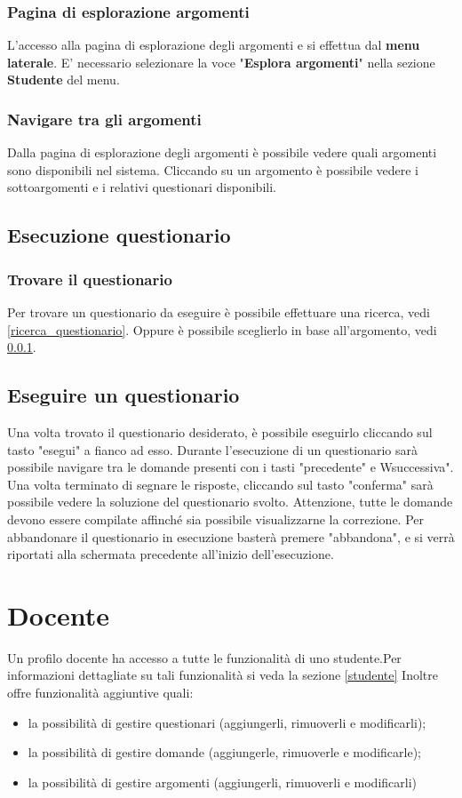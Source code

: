\documentclass[12pt,a4paper]{article}
\begin{document}
	\subsubsection{Pagina di esplorazione argomenti} \label{esplorazione_arg}
	L'accesso alla pagina di esplorazione degli argomenti e si effettua dal \textbf{menu laterale}. 
	E' necessario selezionare la voce "\textbf{Esplora argomenti}" nella sezione \textbf{Studente} del menu.
	\subsubsection{Navigare tra gli argomenti}
	Dalla pagina di esplorazione degli argomenti è possibile vedere quali argomenti sono disponibili nel sistema. Cliccando su un argomento è possibile vedere i sottoargomenti e i relativi questionari disponibili.
	
	\subsection{Esecuzione questionario}
	\subsubsection{Trovare il questionario}
	Per trovare un questionario da eseguire è possibile effettuare una ricerca, vedi \ref{ricerca_questionario}.
	Oppure è possibile sceglierlo in base all'argomento, vedi \ref{esplorazione_arg}.
	\subsection{Eseguire un questionario}
	Una  volta trovato il questionario desiderato, è possibile eseguirlo cliccando sul tasto "esegui" a fianco ad esso.
	Durante l'esecuzione di un questionario sarà possibile navigare tra le domande presenti con i tasti "precedente" e Wsuccessiva".
	Una volta terminato di segnare le risposte, cliccando sul tasto "conferma" sarà possibile vedere la soluzione del questionario svolto.
	Attenzione, tutte le domande devono essere compilate affinché sia possibile visualizzarne la correzione.
	Per abbandonare il questionario in esecuzione basterà premere "abbandona", e si verrà riportati alla schermata precedente all'inizio dell'esecuzione.
	
	\section{Docente}\label{docente}
	Un profilo docente ha accesso a tutte le funzionalità di uno studente.Per informazioni dettagliate su tali funzionalità si veda la sezione \ref{studente}
		Inoltre offre funzionalità aggiuntive quali:
		\begin{itemize}
			\item la possibilità di gestire questionari (aggiungerli, rimuoverli e modificarli);
			\item la possibilità di gestire domande (aggiungerle, rimuoverle e modificarle);
			\item la possibilità di gestire argomenti (aggiungerli, rimuoverli e modificarli)
		\end{itemize}
\end{document}
